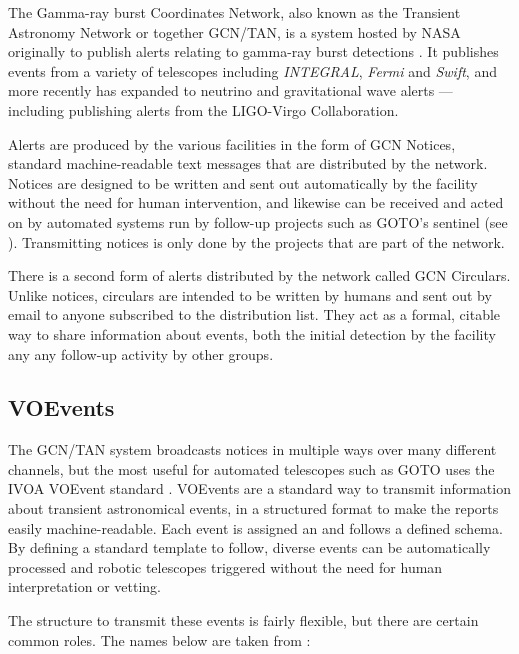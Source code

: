 \begin{colsection}
\begin{colsection}
The Gamma-ray burst Coordinates Network, also known as the Transient Astronomy Network or together GCN/TAN, is a system hosted by NASA originally to publish alerts relating to gamma-ray burst detections \citep{GCN}. It publishes events from a variety of telescopes including \textit{INTEGRAL}, \textit{Fermi} and \textit{Swift}, and more recently has expanded to neutrino and gravitational wave alerts --- including publishing alerts from the LIGO-Virgo Collaboration.

Alerts are produced by the various facilities in the form of GCN Notices, standard machine-readable text messages that are distributed by the network. Notices are designed to be written and sent out automatically by the facility without the need for human intervention, and likewise can be received and acted on by automated systems run by follow-up projects such as GOTO's sentinel (see ). Transmitting notices is only done by the projects that are part of the network.

There is a second form of alerts distributed by the network called GCN Circulars. Unlike notices, circulars are intended to be written by humans and sent out by email to anyone subscribed to the distribution list. They act as a formal, citable way to share information about events, both the initial detection by the facility any any follow-up activity by other groups.

\end{colsection}


\subsection{VOEvents}
\label{sec:voevents}
\begin{colsection}

The GCN/TAN system broadcasts notices in multiple ways over many different channels, but the most useful for automated telescopes such as GOTO uses the IVOA VOEvent standard \citep{voevent}. VOEvents are a standard way to transmit information about transient astronomical events, in a structured format to make the reports easily machine-readable. Each event is assigned an  and follows a defined schema. By defining a standard template to follow, diverse events can be automatically processed and robotic telescopes triggered without the need for human interpretation or vetting.

The structure to transmit these events is fairly flexible, but there are certain common roles. The names below are taken from \citet{voevent}:


\end{colsection}
\end{colsection}
